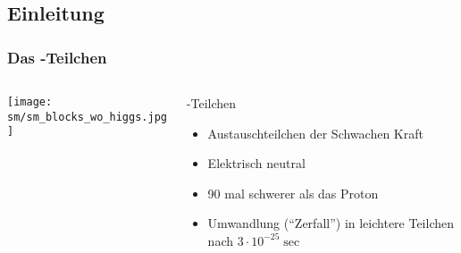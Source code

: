 \subsection{Einleitung}
\begin{frame}
  \frametitle{Das \znull-Teilchen}
  \begin{columns}
    \begin{column}{0.6\textwidth}
      \centering
      \texttt{[image: sm/sm\_blocks\_wo\_higgs.jpg]}
    \end{column}
    \begin{column}{0.4\textwidth}
      \begin{block}{\znull-Teilchen}
        \begin{itemize}
        \item Austauschteilchen der Schwachen Kraft
        \item Elektrisch neutral
        \item 90 mal schwerer als das Proton
        \item Umwandlung (``Zerfall'') in leichtere Teilchen nach $3\cdot10^{-25}\sec$
        \end{itemize}
      \end{block}
    \end{column}
  \end{columns}
\end{frame}

